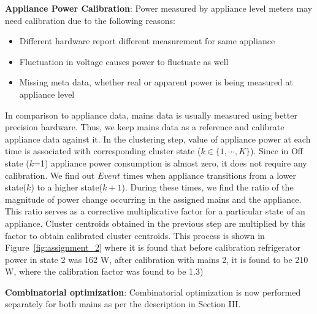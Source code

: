\documentclass[conference]{IEEEtran}
\newcommand{\figref}[1]{Figure~\ref{#1}}
\begin{document}
\noindent\textbf{Appliance Power Calibration}: 
Power measured by appliance level meters may need calibration due to the following reasons:
\begin{itemize}
\item Different hardware report different measurement for same appliance \cite{berges2008}
\item Fluctuation in voltage causes power to fluctuate as well\cite{hart}
\item Missing meta data, whether real or apparent power is being measured at appliance level

\end{itemize} In comparison to appliance data, mains data is usually measured using better precision hardware. Thus, we keep mains data as a reference and calibrate appliance data against it. In the clustering step, value of appliance power at each time is associated with corresponding cluster state ($k \in \{1,\cdots,K\}$). Since in Off state ($k$=1) appliance power consumption is almost zero, it does not require any calibration. We find out $Event$ times when appliance transitions from a lower state($k$) to a higher state($k+1$). During these times, we find the ratio of the magnitude of power change occurring in the assigned mains and the appliance. This ratio serves as a corrective multiplicative factor for a particular  state of an appliance. Cluster centroids obtained in the previous step are multiplied by this factor to obtain calibrated cluster centroids.
This process is shown in \figref{fig:assignment_2} where it is found that before calibration refrigerator power in state 2 was 162 W, after calibration with mains 2, it is found to be 210 W, where the calibration factor was found to be 1.3)

\noindent\textbf{Combinatorial optimization}: Combinatorial optimization is now performed separately for both mains as per the description in Section III.
\end{document}
